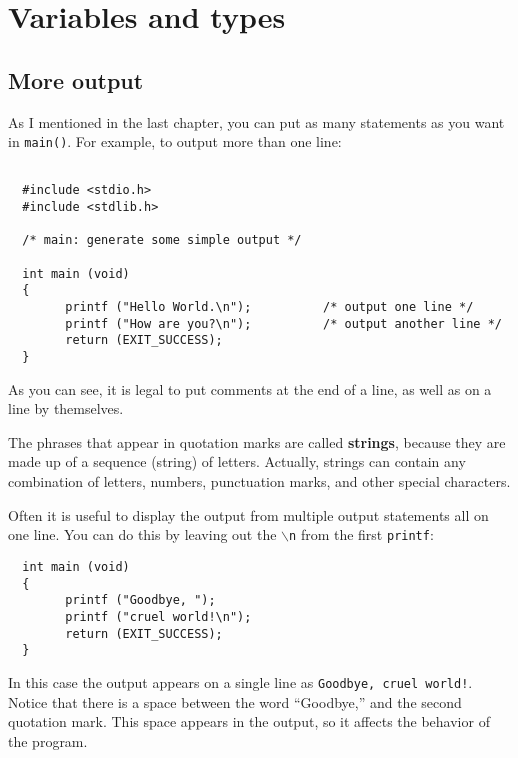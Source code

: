 
\setcounter{chapter}{1}
\chapter{Variables and types}

\section{More output}

As I mentioned in the last chapter, you can put as many statements as
you want in {\tt main()}.  For example, to output more than one line:

\begin{verbatim}

  #include <stdio.h>
  #include <stdlib.h>

  /* main: generate some simple output */

  int main (void)
  {
        printf ("Hello World.\n");		    /* output one line */
        printf ("How are you?\n");		    /* output another line */       
        return (EXIT_SUCCESS);
  }

\end{verbatim}
%
As you can see, it is legal to put comments at the
end of a line, as well as on a line by themselves.


The phrases that appear in quotation marks are called {\bf strings},
because they are made up of a sequence (string) of letters.  Actually,
strings can contain any combination of letters, numbers, punctuation
marks, and other special characters.


Often it is useful to display the output from multiple output
statements all on one line.  You can do this by leaving out
the {\tt $\backslash$n} from the first {\tt printf}:

\begin{verbatim}
  int main (void)
  {
        printf ("Goodbye, ");
        printf ("cruel world!\n");	     
        return (EXIT_SUCCESS);
  }
\end{verbatim}
%
In this case the output appears on a single line as
{\tt Goodbye, cruel world!}.  Notice that there is a space
between the word ``Goodbye,'' and the second quotation mark.
This space appears in the output, so it affects the behavior
of the program.

